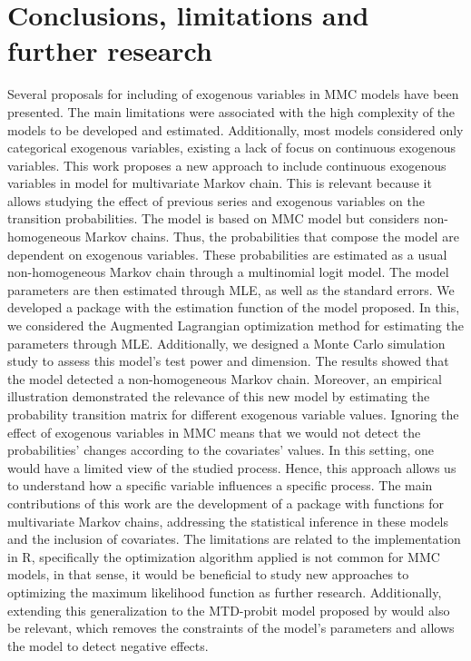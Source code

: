 \section{Conclusions, limitations and further research}\label{conclusions-limitations-and-further-research}

Several proposals for including of exogenous variables in MMC models have been presented. The main limitations were associated with the high complexity of the models to be developed and estimated. Additionally, most models considered only categorical exogenous variables, existing a lack of focus on continuous exogenous variables. This work proposes a new approach to include continuous exogenous variables in \citet{Ching2002} model for multivariate Markov chain. This is relevant because it allows studying the effect of previous series and exogenous variables on the transition probabilities. The model is based on \citet{Ching2002} MMC model but considers non-homogeneous Markov chains. Thus, the probabilities that compose the model are dependent on exogenous variables. These probabilities are estimated as a usual non-homogeneous Markov chain through a multinomial logit model. The model parameters are then estimated through MLE, as well as the standard errors. We developed a package with the estimation function of the model proposed. In this, we considered the Augmented Lagrangian optimization method for estimating the parameters through MLE. Additionally, we designed a Monte Carlo simulation study to assess this model's test power and dimension. The results showed that the model detected a non-homogeneous Markov chain. Moreover, an empirical illustration demonstrated the relevance of this new model by estimating the probability transition matrix for different exogenous variable values. Ignoring the effect of exogenous variables in MMC means that we would not detect the probabilities' changes according to the covariates' values. In this setting, one would have a limited view of the studied process. Hence, this approach allows us to understand how a specific variable influences a specific process. The main contributions of this work are the development of a package with functions for multivariate Markov chains, addressing the statistical inference in these models and the inclusion of covariates. The limitations are related to the implementation in R, specifically the optimization algorithm applied is not common for MMC models, in that sense, it would be beneficial to study new approaches to optimizing the maximum likelihood function as further research. Additionally, extending this generalization to the MTD-probit model proposed by \citet{Nicolau2014} would also be relevant, which removes the constraints of the model's parameters and allows the model to detect negative effects.

